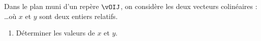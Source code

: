 \begin{exo}{}
	Dans le plan muni d'un repère $\vOIJ$, on considère les deux vecteurs colinéaires :
	\ldots où $x$ et $y$ sont deux entiers relatifs.

	\begin{enumerate}
		\item Déterminer les valeurs de $x$ et $y$.
	\end{enumerate}
\end{exo}
